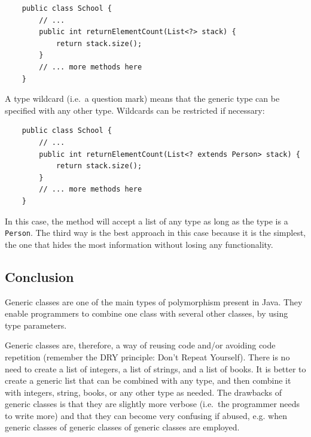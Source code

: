 \begin{verbatim}
    public class School {
        // ...
        public int returnElementCount(List<?> stack) {
            return stack.size();
        }
        // ... more methods here
    }
\end{verbatim}

A type wildcard (i.e.~a question mark) means that the generic
type can be specified with any other type. Wildcards can be restricted
if necessary: 

\begin{verbatim}
    public class School {
        // ...
        public int returnElementCount(List<? extends Person> stack) {
            return stack.size();
        }
        // ... more methods here
    }
\end{verbatim}

In this case, the method will accept a list of any type as long as the
type is a \verb+Person+. The third way is the best approach in this
case because it is the simplest, the one that hides the most
information without losing any functionality. 

%
% 
% 


\subsection{Conclusion}
\label{sec:conclusion-2}

Generic classes are one of the main types of polymorphism present in
Java. They enable programmers to combine one class with several other
classes, by using type parameters. 

Generic classes are, therefore, a way of reusing code and/or avoiding
code repetition (remember the DRY principle: Don't Repeat Yourself). 
There is no need to create a list of integers, a list of
strings, and a list of books. It is better to create a generic list
that can be combined with any type, and then combine it with integers,
string, books, or any other type as needed. The drawbacks of generic
classes is that they are slightly more verbose (i.e.~the programmer
needs to write more) and that they can become very confusing if
abused, e.g. when generic classes of generic classes of generic
classes are employed. 

